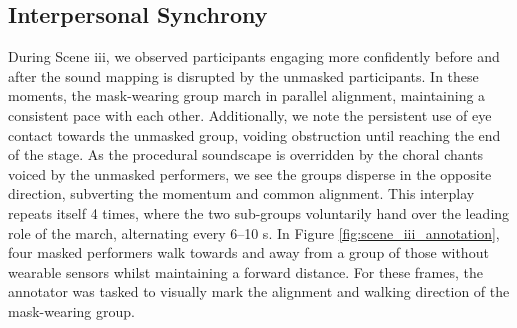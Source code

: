 %


\subsection*{Interpersonal Synchrony}

During Scene iii, we observed participants engaging more confidently before and after the sound mapping is disrupted by the unmasked participants. In these moments, the mask-wearing group march in parallel alignment, maintaining a consistent pace with each other. Additionally, we note the persistent use of eye contact towards the unmasked group, voiding obstruction until reaching the end of the stage. As the procedural soundscape is overridden by the choral chants voiced by the unmasked performers, we see the groups disperse in the opposite direction, subverting the momentum and common alignment. This interplay repeats itself 4 times, where the two sub-groups voluntarily hand over the leading role of the march, alternating every 6--10 s. In Figure \ref{fig:scene_iii_annotation}, four masked performers walk towards and away from a group of those without wearable sensors whilst maintaining a forward distance. For these frames, the annotator was tasked to visually mark the alignment and walking direction of the mask-wearing group.


